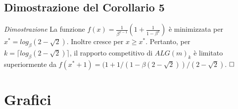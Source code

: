 \documentclass[12pt]{article}
\begin{document}
\subsection{Dimostrazione del Corollario 5}
\textit{Dimostrazione} La funzione $f (x) = \frac{1} {\beta^{x - 1}} (1 + \frac{1}{1 - \beta^{x}})$ è minimizzata per $x^{*} = log_{\beta} (2 - \sqrt{2})$. Inoltre cresce per $x \geq x^{*}$. Pertanto, per $k = \lceil log_{\beta} (2 - \sqrt{2})\rceil$, il rapporto competitivo di $ALG(m)_{k}$ è limitato superiormente da $f(x^{*} + 1) = (1 + 1 / (1 - \beta (2 - \sqrt{2})) / (2 -\sqrt{2})$. $\hfill \square$

\section{Grafici}
\end{document}
